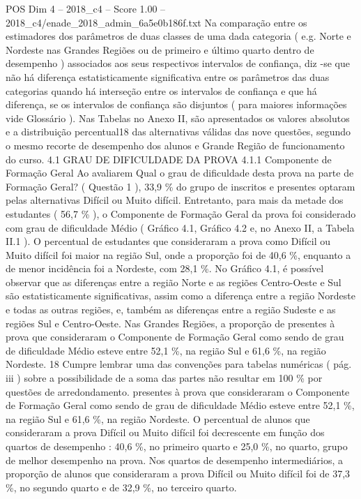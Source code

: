 \begin{textsample}{POS Dim 4 – 2018\_c4 – Score 1.00 – 2018\_c4/enade\_2018\_admin\_6a5e0b186f.txt}
Na comparação entre os estimadores dos parâmetros de duas classes de uma dada categoria ( e.g.
Norte e Nordeste nas Grandes Regiões ou de primeiro e último quarto dentro de desempenho ) associados aos seus respectivos intervalos de confiança, diz -se que não há diferença estatisticamente significativa entre os parâmetros das duas categorias quando há interseção entre os intervalos de confiança e que há diferença, se os intervalos de confiança são disjuntos ( para maiores informações vide Glossário ).
Nas Tabelas no Anexo II, são apresentados os valores absolutos e a distribuição percentual18 das alternativas válidas das nove questões, segundo o mesmo recorte de desempenho dos alunos e Grande Região de funcionamento do curso. 4.1 GRAU DE DIFICULDADE DA PROVA 4.1.1 Componente de Formação Geral Ao avaliarem Qual o grau de dificuldade desta prova na parte de Formação Geral? ( Questão 1 ), 33,9 \% do grupo de inscritos e presentes optaram pelas alternativas Difícil ou Muito difícil.
Entretanto, para mais da metade dos estudantes ( 56,7 \% ), o Componente de Formação Geral da prova foi considerado com grau de dificuldade Médio ( Gráfico 4.1, Gráfico 4.2 e, no Anexo II, a Tabela II.1 ).
O percentual de estudantes que consideraram a prova como Difícil ou Muito difícil foi maior na região Sul, onde a proporção foi de 40,6 \%, enquanto a de menor incidência foi a Nordeste, com 28,1 \%.
No Gráfico 4.1, é possível observar que as diferenças entre a região Norte e as regiões Centro-Oeste e Sul são estatisticamente significativas, assim como a diferença entre a região Nordeste e todas as outras regiões, e, também as diferenças entre a região Sudeste e as regiões Sul e Centro-Oeste.
Nas Grandes Regiões, a proporção de presentes à prova que consideraram o Componente de Formação Geral como sendo de grau de dificuldade Médio esteve entre 52,1 \%, na região Sul e 61,6 \%, na região Nordeste. 18 Cumpre lembrar uma das convenções para tabelas numéricas ( pág. iii ) sobre a possibilidade de a soma das partes não resultar em 100 \% por questões de arredondamento. presentes à prova que consideraram o Componente de Formação Geral como sendo de grau de dificuldade Médio esteve entre 52,1 \%, na região Sul e 61,6 \%, na região Nordeste.
O percentual de alunos que consideraram a prova Difícil ou Muito difícil foi decrescente em função dos quartos de desempenho : 40,6 \%, no primeiro quarto e 25,0 \%, no quarto, grupo de melhor desempenho na prova.
Nos quartos de desempenho intermediários, a proporção de alunos que consideraram a prova Difícil ou Muito difícil foi de 37,3 \%, no segundo quarto e de 32,9 \%, no terceiro quarto.

\end{textsample}

